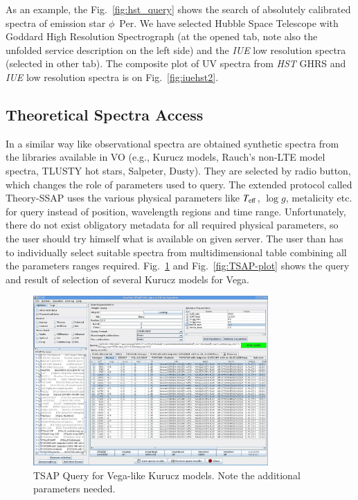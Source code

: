 \documentclass[final,authoryear,5p,times,twocolumn]{elsarticle}
\begin{document}
As an example, the Fig.~\ref{fig:hst_query} shows the search of
absolutely calibrated spectra of emission star $\phi$~Per. We have
selected Hubble Space Telescope with Goddard High Resolution
Spectrograph (at the opened tab, note also the unfolded service
description on the left side) and the \emph{IUE} low resolution spectra
(selected in other tab).  The composite plot of UV spectra from \emph{HST}
GHRS  and \emph{IUE} low resolution spectra is on Fig.~\ref{fig:iuehst2}.

\subsection{ Theoretical Spectra Access}

In a similar way like observational spectra  are obtained synthetic spectra
from the libraries  available in VO (e.g., Kurucz models, Rauch's non-LTE model
spectra, TLUSTY hot stars, Salpeter, Dusty). They are selected by radio
button, which  changes the role of parameters used to query. The extended
protocol called Theory-SSAP \citep[hereafter TSAP;][]{ssap} uses  the various
physical parameters like $T_{\rm eff}$, $\log g$, metalicity etc. for query
instead of position, wavelength regions and time range. Unfortunately, there do
not exist obligatory metadata for all required physical parameters, so the user should try
himself what is available on given server.  The user than has to individually
select suitable spectra from multidimensional table combining all the
parameters ranges required.  Fig.~\ref{fig:TSAP-query} and
Fig.~\ref{fig:TSAP-plot} shows the query and result of selection of several Kurucz models for
Vega.


\begin{figure}[t]
\begin{center}
\includegraphics[width=0.8\textwidth]{TSSA-query.pdf}
\caption{TSAP Query for Vega-like Kurucz models. Note the additional parameters needed.}
\label{fig:TSAP-query}
\end{center}
\end{figure}
\end{document}
